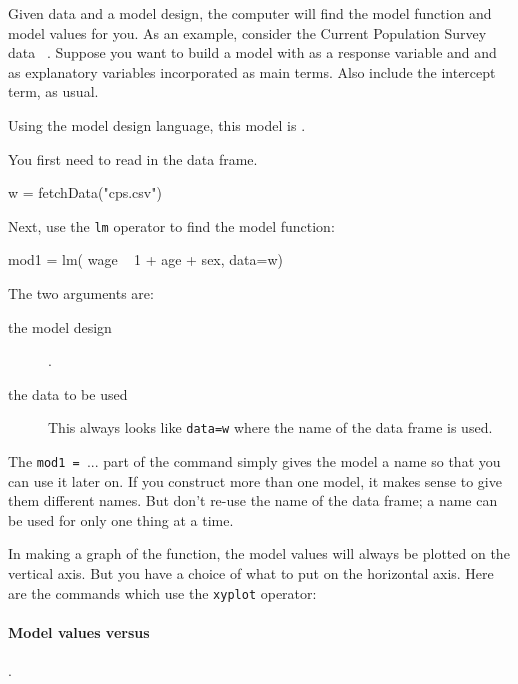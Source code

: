 





Given data and a model design, the computer will find the model
function and model values for you.  
As an example, consider the Current Population
Survey  data \datasetCPS~.  Suppose you want to build a model with
 as a response variable and  and
 as explanatory variables incorporated as main
terms.  Also include the intercept term, as usual.

Using the model design language, this model is .

You first need to read in the data frame.  
\begin{Schunk}
\begin{Sinput}
 w = fetchData("cps.csv")
\end{Sinput}
\end{Schunk}


Next, use the \texttt{lm} operator to find the model function:
\begin{Schunk}
\begin{Sinput}
 mod1 = lm( wage ~ 1 + age + sex, data=w)
\end{Sinput}
\end{Schunk}


The two arguments are:
\begin{description}
\item[the model design] . 
\item[the data to be used]  This always looks like \texttt{data=w}
  where the name of the data frame is used.
\end{description}

The \texttt{mod1 = }... part of the command simply gives the model a
name so that you can use it later on.  If you construct more than one
model, it makes sense to give them different names.  But don't re-use
the name of the data frame; a name can be used for only one thing at a
time.

In making a graph of the function, the model values will always be
plotted on the vertical axis.  But you have a choice of what to put on
the horizontal axis.  Here are the commands which use the
\texttt{xyplot} operator:

\paragraph{Model values versus }.
  
